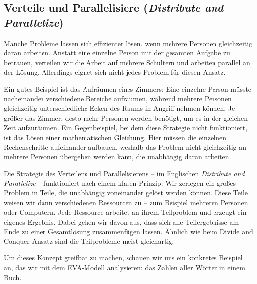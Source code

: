 \documentclass[
  ngerman,
  letterpaper,
  DIV=11]{scrreprt}
\begin{document}
\subsection{\texorpdfstring{Verteile und Parallelisiere
(\emph{Distribute and
Parallelize})}{Verteile und Parallelisiere (Distribute and Parallelize)}}\label{verteile-und-parallelisiere-distribute-and-parallelize}

Manche Probleme lassen sich effizienter lösen, wenn mehrere Personen
gleichzeitig daran arbeiten. Anstatt eine einzelne Person mit der
gesamten Aufgabe zu betrauen, verteilen wir die Arbeit auf mehrere
Schultern und arbeiten parallel an der Lösung. Allerdings eignet sich
nicht jedes Problem für diesen Ansatz.

Ein gutes Beispiel ist das Aufräumen eines Zimmers: Eine einzelne Person
müsste nacheinander verschiedene Bereiche aufräumen, während mehrere
Personen gleichzeitig unterschiedliche Ecken des Raums in Angriff nehmen
können. Je größer das Zimmer, desto mehr Personen werden benötigt, um es
in der gleichen Zeit aufzuräumen. Ein Gegenbeispiel, bei dem diese
Strategie nicht funktioniert, ist das Lösen einer mathematischen
Gleichung. Hier müssen die einzelnen Rechenschritte aufeinander
aufbauen, weshalb das Problem nicht gleichzeitig an mehrere Personen
übergeben werden kann, die unabhängig daran arbeiten.

Die Strategie des Verteilens und Parallelisierens -- im Englischen
\emph{Distribute and Parallelize} -- funktioniert nach einem klaren
Prinzip: Wir zerlegen ein großes Problem in Teile, die unabhängig
voneinander gelöst werden können. Diese Teile weisen wir dann
verschiedenen Ressourcen zu -- zum Beispiel mehreren Personen oder
Computern. Jede Ressource arbeitet an ihrem Teilproblem und erzeugt ein
eigenes Ergebnis. Dabei gehen wir davon aus, dass sich alle
Teilergebnisse am Ende zu einer Gesamtlösung zusammenfügen lassen.
Ähnlich wie beim Divide and Conquer-Ansatz sind die Teilprobleme meist
gleichartig.

Um dieses Konzept greifbar zu machen, schauen wir uns ein konkretes
Beispiel an, das wir mit dem EVA-Modell analysieren: das Zählen aller
Wörter in einem Buch.
\end{document}
